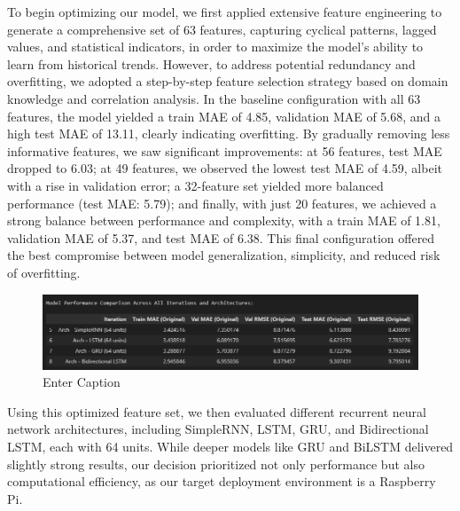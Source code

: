 To begin optimizing our model, we first applied extensive feature engineering to generate a comprehensive set of 63 features, capturing cyclical patterns, lagged values, and statistical indicators, in order to maximize the model’s ability to learn from historical trends. However, to address potential redundancy and overfitting, we adopted a step-by-step feature selection strategy based on domain knowledge and correlation analysis. In the baseline configuration with all 63 features, the model yielded a train MAE of 4.85, validation MAE of 5.68, and a high test MAE of 13.11, clearly indicating overfitting. By gradually removing less informative features, we saw significant improvements: at 56 features, test MAE dropped to 6.03; at 49 features, we observed the lowest test MAE of 4.59, albeit with a rise in validation error; a 32-feature set yielded more balanced performance (test MAE: 5.79); and finally, with just 20 features, we achieved a strong balance between performance and complexity, with a train MAE of 1.81, validation MAE of 5.37, and test MAE of 6.38. This final configuration offered the best compromise between model generalization, simplicity, and reduced risk of overfitting.
\begin{figure}[H]
    \centering
    \includegraphics[width=0.75\linewidth]{Figures/model_selection.png}
    \caption{Enter Caption}
    \label{fig:enter-label}
\end{figure}
Using this optimized feature set, we then evaluated different recurrent neural network architectures, including SimpleRNN, LSTM, GRU, and Bidirectional LSTM, each with 64 units. While deeper models like GRU and BiLSTM delivered slightly strong results, our decision prioritized not only performance but also computational efficiency, as our target deployment environment is a Raspberry Pi.

